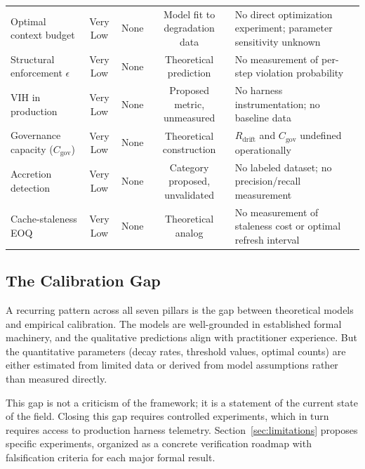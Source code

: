 \begin{table}[H]
\begin{tabular}{p{3cm}cccp{4.2cm}}
Optimal context budget & Very Low & None & Model fit to degradation data & No direct optimization experiment; parameter sensitivity unknown \\
\addlinespace
Structural enforcement $\epsilon$ & Very Low & None & Theoretical prediction & No measurement of per-step violation probability \\
\addlinespace
VIH in production & Very Low & None & Proposed metric, unmeasured & No harness instrumentation; no baseline data \\
\addlinespace
Governance capacity ($C_{\text{gov}}$) & Very Low & None & Theoretical construction & $R_{\text{drift}}$ and $C_{\text{gov}}$ undefined operationally \\
\addlinespace
Accretion detection & Very Low & None & Category proposed, unvalidated & No labeled dataset; no precision/recall measurement \\
\addlinespace
Cache-staleness EOQ & Very Low & None & Theoretical analog & No measurement of staleness cost or optimal refresh interval \\
\bottomrule
\end{tabular}
\end{table}

\subsection{The Calibration Gap}

A recurring pattern across all seven pillars is the gap between theoretical models and empirical calibration. The models are well-grounded in established formal machinery, and the qualitative predictions align with practitioner experience. But the quantitative parameters (decay rates, threshold values, optimal counts) are either estimated from limited data or derived from model assumptions rather than measured directly.

This gap is not a criticism of the framework; it is a statement of the current state of the field. Closing this gap requires controlled experiments, which in turn requires access to production harness telemetry. Section~\ref{sec:limitations} proposes specific experiments, organized as a concrete verification roadmap with falsification criteria for each major formal result.


